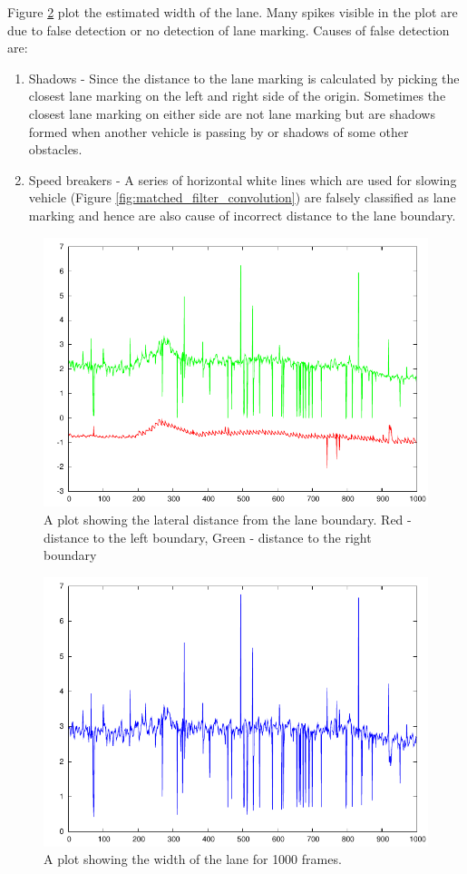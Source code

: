 Figure \ref{fig:lane_width} plot the estimated width of the lane. Many spikes visible in the plot are due to false detection or no detection of lane marking. Causes of false detection are: 
\begin{enumerate}
  \item Shadows - Since the distance to the lane marking is calculated by picking the closest lane marking on the left and right side of the origin. Sometimes the closest lane marking on either side are not lane marking but are shadows formed when another vehicle is passing by or shadows of some other obstacles. 
  \item Speed breakers - A series of horizontal white lines which are used for slowing vehicle (Figure \ref{fig:matched_filter_convolution}) are falsely classified as lane marking and hence are also cause of incorrect distance to the lane boundary. 
\end{enumerate}

\begin{figure}
\centering
\includegraphics[width=150mm]{figures/lateral_distance.pdf}
\caption{A plot showing the lateral distance from the lane boundary. Red - distance to the left boundary, Green - distance to the right boundary}
\label{fig:lateral_distance}
\end{figure}

\begin{figure}
\centering
\includegraphics[width=150mm]{figures/lane_width.pdf}
\caption{A plot showing the width of the lane for 1000 frames.}
\label{fig:lane_width}
\end{figure}
